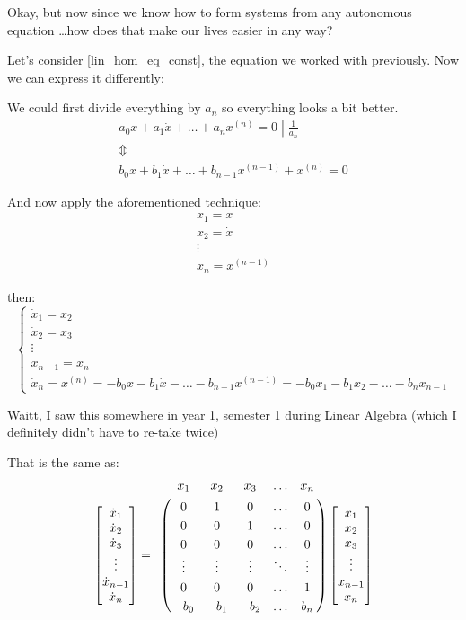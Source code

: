 Okay, but now since we know how to form systems from any autonomous equation \dots how does that make our lives easier in any way?

Let's consider \ref{lin_hom_eq_const}, the equation we worked with previously. Now we can express it differently:

We could first divide everything by $a_{n}$ so everything looks a bit better.
\begin{gather*}
	\left. a_0 x + a_1\dot{x}+ \dots +a_{n} x^{(n)} = 0 \middle| \frac{1}{a_{n}} \right. \\
	\Updownarrow \\
	b_0 x + b_1\dot{x} + \dots + b_{n-1} x^{(n-1)} + x^{(n)} = 0
\end{gather*}

And now apply the aforementioned technique:
\begin{gather*}
	x_1 = x     \\
	x_2 = \dot{x} \\
	\vdots \\
	x_n = x^{(n-1)}
\end{gather*}

then:
\[
	\begin{cases}
		\dot{x}_1 = x_2     \\
		\dot{x}_2 = x_3     \\
		\vdots              \\
		\dot{x}_{n-1} = x_n \\
		\dot{x}_n  = x^{(n)} = -b_0x - b_1\dot{x} - \dots - b_{n-1} x^{(n-1)} = -b_0 x_1 - b_1 x_2 - \dots - b_n x_{n-1}
	\end{cases}
\]

Waitt, I saw this somewhere in year 1, semester 1 during Linear Algebra (which I definitely didn't have to re-take twice)

That is the same as:
\begin{align*}
	\begin{bmatrix}
		\dot{x}_1     \\
		\dot{x}_2     \\
		\dot{x}_3     \\
		\vdots        \\
		\dot{x}_{n-1} \\
		\dot{x}_n
	\end{bmatrix} =
	\bordermatrix{ & x_1    & x_2    & x_3    & \ldots & x_n \cr
		& 0      & 1      & 0      & \ldots & 0 \cr
		& 0      & 0      & 1      & \ldots & 0 \cr
		& 0      & 0      & 0      & \ldots & 0 \cr
		& \vdots & \vdots & \vdots & \ddots & \vdots \cr
		& 0      & 0      & 0      & \ldots & 1 \cr
	& -b_0   & -b_1   & -b_2   & \ldots & b_n }
	\begin{bmatrix}
		x_1     \\
		x_2     \\
		x_3     \\
		\vdots  \\
		x_{n-1} \\
		x_n
	\end{bmatrix}
\end{align*}

